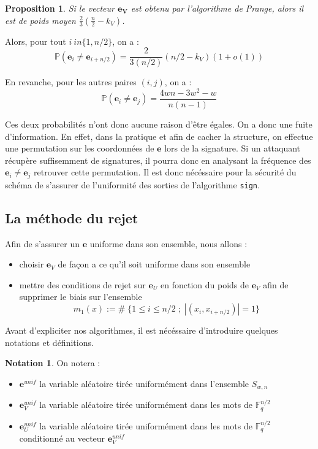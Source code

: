 \documentclass[12pt]{article}
\theoremstyle{plain}
\newtheorem{propo}[thm]{Proposition}
\theoremstyle{definition}
\newtheorem{nota}[thm]{Notation}
\newcommand{\F}{\mathbb{F}}
\newcommand{\e}{\mathbf{e}}
\begin{document}
\begin{propo}
Si le vecteur $\mathbf{e_V}$ est obtenu par l'algorithme de Prange, alors il est de poids moyen $\frac{2}{3}(\frac{n}{2}-k_V)$.
\end{propo}

\noindent Alors, pour tout $i \ in \{1,n/2\}$, on a :
$$ \mathbb{P}(\mathbf{e}_i \neq \mathbf{e}_{i+n/2}) = \frac{2}{3(n/2)}(n/2-k_V)(1+o(1))$$

\noindent En revanche, pour les autres paires $(i,j)$, on a :
$$ \mathbb{P}(\mathbf{e}_i \neq \mathbf{e}_{j}) = \frac{4wn - 3w^2-w}{n(n-1)}$$

\noindent Ces deux probabilités n'ont donc aucune raison d'être égales. On a donc une fuite d'information. En effet, dans la pratique et afin de cacher la structure, on effectue une permutation sur les coordonnées de $\mathbf{e}$ lors de la signature. Si un attaquant récupère suffisemment de signatures, il pourra donc en analysant la fréquence des $\mathbf{e}_i \neq \mathbf{e}_j$ retrouver cette permutation. Il est donc nécéssaire pour la sécurité du schéma de s'assurer de l'uniformité des sorties de l'algorithme \verb|sign|.

\subsection{La méthode du rejet}
Afin de s'assurer un $\mathbf{e}$ uniforme dans son ensemble, nous allons :
\begin{itemize}
\item choisir $\mathbf{e}_V$ de façon a ce qu'il soit uniforme dans son ensemble 
\item mettre des conditions de rejet sur $\mathbf{e}_U$ en fonction du poids de $\mathbf{e}_V$ afin de supprimer le biais sur l'ensemble 
$$ m_1(x) := \# \; \{1  \leq i \leq n/2 \;;\; |(x_i, x_{i+n/2})| = 1\}$$
\end{itemize}
Avant d'expliciter nos algorithmes, il est nécéssaire d'introduire quelques notations et définitions. \\

\begin{nota} On notera :
\begin{itemize}
\item $\mathbf{e}^{unif}$ la variable aléatoire tirée uniformément dans l'ensemble $S_{w,n}$
\item $\mathbf{e}_V^{unif}$ la variable aléatoire tirée uniformément dans les mots de $\F_q^{n/2}$ 
\item $\mathbf{e}_U^{unif}$ la variable aléatoire tirée uniformément dans les mots de $\F_q^{n/2}$ conditionné au vecteur $\e_V^{unif}$
\end{itemize}
\end{nota}
\end{document}
